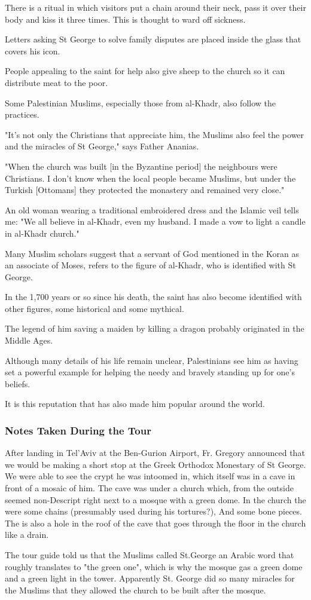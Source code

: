 \documentclass[letterpaper]{report}
\begin{document}
\begin{multicols}{2}
There is a ritual in which visitors put a chain around their neck, pass it over their body and kiss it three times. This is thought to ward off sickness.

Letters asking St George to solve family disputes are placed inside the glass that covers his icon.

People appealing to the saint for help also give sheep to the church so it can distribute meat to the poor.

Some Palestinian Muslims, especially those from al-Khadr, also follow the practices.

"It's not only the Christians that appreciate him, the Muslims also feel the power and the miracles of St George," says Father Ananias.

"When the church was built [in the Byzantine period] the neighbours were Christians. I don't know when the local people became Muslims, but under the Turkish [Ottomans] they protected the monastery and remained very close."

An old woman wearing a traditional embroidered dress and the Islamic veil tells me: "We all believe in al-Khadr, even my husband. I made a vow to light a candle in al-Khadr church."

Many Muslim scholars suggest that a servant of God mentioned in the Koran as an associate of Moses, refers to the figure of al-Khadr, who is identified with St George.

In the 1,700 years or so since his death, the saint has also become identified with other figures, some historical and some mythical.

The legend of him saving a maiden by killing a dragon probably originated in the Middle Ages.

Although many details of his life remain unclear, Palestinians see him as having set a powerful example for helping the needy and bravely standing up for one's beliefs.

It is this reputation that has also made him popular around the world.

\subsubsection{Notes Taken During the Tour}
After landing in Tel'Aviv at the Ben-Gurion Airport, Fr. Gregory announced that we would be making a short stop at the Greek Orthodox Monestary of St George. We were able to see the crypt he was intoomed in, which itself was in a cave in front of a mosaic of him. The cave was under a church which, from the outside seemed non-Descript right next to a mosque with a green dome. In the church the were some chains (presumably used during his tortures?), And some bone pieces. The is also a hole in the roof of the cave that goes through the floor in the church like a drain.

The tour guide told us that the Muslims called St.George an Arabic word that roughly translates to "the green one", which is why the mosque gas a green dome and a green light in the tower. Apparently St. George did so many miracles for the Muslims that they allowed the church to be built after the mosque.
\end{multicols}
\end{document}
